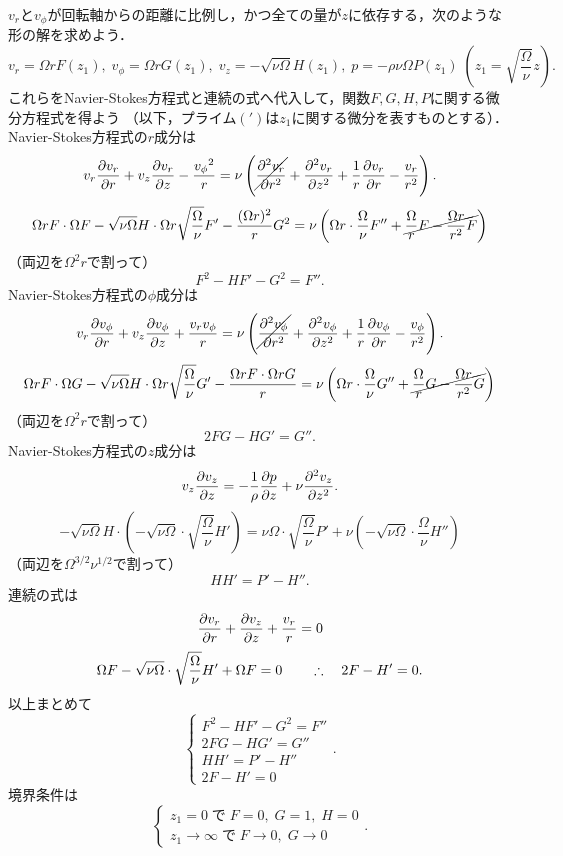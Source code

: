$v_r$と$v_\phi$が回転軸からの距離に比例し，かつ全ての量が$z$に依存する，次のような形の解を求めよう．
\begin{equation}
    v_r = \Omega r F(z_1), \; v_\phi = \Omega r G(z_1), \; 
    v_z = - \sqrt{\nu\Omega} H(z_1), \; p = -\rho\nu\Omega P(z_1) \;
    \left( z_1 = \sqrt{\frac{\Omega}{\nu}}z\right) .
\end{equation}
これらをNavier-Stokes方程式と連続の式へ代入して，関数$F,G,H,P$に関する微分方程式を得よう
（以下，プライム$(')$は$z_1$に関する微分を表すものとする）．
Navier-Stokes方程式の$r$成分は
\[
    v_r \pdv{v_r}{r} + v_z \pdv{v_r}{z} - \frac{{v_\phi}^2}{r} = \nu \left( \cancel{\pdv[2]{v_r}{r}} + \pdv[2]{v_r}{z} + \frac{1}{r}\pdv{v_r}{r} - \frac{v_r}{r^2} \right).
\]
\[
    \Omega rF \cdot \Omega F - \sqrt{\nu\Omega}H \cdot \Omega r \sqrt{\frac{\Omega}{\nu}} F' - \frac{(\Omega r)^2}{r} G^2
    = \nu \left( \Omega r \cdot \frac{\Omega}{\nu} F'' + \cancel{ \frac{\Omega}{r}F - \frac{\Omega r}{r^2} F } \right)
\]
（両辺を$\Omega^2r$で割って）
\[
    F^2 - HF' - G^2 = F''.
\]
Navier-Stokes方程式の$\phi$成分は
\[
    v_r \pdv{v_\phi}{r} + v_z \pdv{v_\phi}{z} + \frac{v_rv_\phi}{r} = \nu \left( \cancel{\pdv[2]{v_\phi}{r}} + \pdv[2]{v_\phi}{z} + \frac{1}{r}\pdv{v_\phi}{r} - \frac{v_\phi}{r^2} \right).
\]
\[
    \Omega rF \cdot \Omega G - \sqrt{\nu\Omega}H \cdot \Omega r \sqrt{\frac{\Omega}{\nu}} G' - \frac{\Omega rF \cdot \Omega rG}{r}
    = \nu \left( \Omega r \cdot \frac{\Omega}{\nu} G'' + \cancel{ \frac{\Omega}{r}G - \frac{\Omega r}{r^2} G } \right)
\]
（両辺を$\Omega^2r$で割って）
\[
    2FG - HG' = G''.
\]
Navier-Stokes方程式の$z$成分は
\[
    v_z\pdv{v_z}{z} = -\frac{1}{\rho} \pdv{p}{z} + \nu \pdv[2]{v_z}{z}.
\]
\[
    -\sqrt{\nu\Omega}H \cdot \left( -\sqrt{\nu\Omega} \cdot \sqrt{\frac{\Omega}{\nu}} H' \right)
    = \nu\Omega \cdot \sqrt{\frac{\Omega}{\nu}} P' + \nu\left( -\sqrt{\nu\Omega} \cdot \frac{\Omega}{\nu} H'' \right)
\]
（両辺を$\Omega^{3/2}\nu^{1/2}$で割って）
\[
    HH' = P' - H''.
\]
連続の式は
\[
    \pdv{v_r}{r} + \pdv{v_z}{z} + \frac{v_r}{r} = 0
\]
\[
    \Omega F - \sqrt{\nu\Omega} \cdot \sqrt{\frac{\Omega}{\nu}} H' + \Omega F = 0
    \qquad \therefore\quad 2F- H' = 0.
\]
以上まとめて
\begin{equation}
    \begin{cases}
        F^2 - HF' - G^2 = F'' \\
        2FG - HG' = G'' \\
        HH' = P' - H'' \\
        2F- H' = 0 
    \end{cases} .
\end{equation}
境界条件は
\begin{equation}
    \begin{cases}
        z_1=0\;\text{で}\; F=0, \; G=1, \; H=0 \\
        z_1\to\infty\;\text{で}\; F\to0, \; G\to0
    \end{cases}.
\end{equation}


